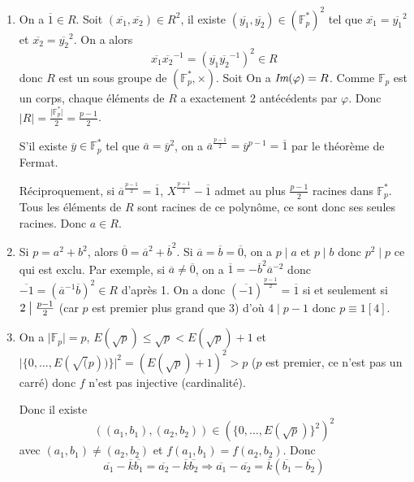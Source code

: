 \begin{solution}
	\phantom{}
	\begin{enumerate}
		\item On a $\overline{1}\in R$. Soit $(\overline{x_{1}},\overline{x_{2}})\in R^{2}$, il existe $(\overline{y_{1}},\overline{y_{2}})\in(\mathbb{F}_{p}^{*})^{2}$ tel que $\overline{x_{1}}=\overline{y_{1}}^{2}$ et $\overline{x_{2}}=\overline{y_{2}}^{2}$. On a  alors 
		$$\overline{x_{1}}\overline{x_{2}}^{-1}=(\overline{y_{1}}\overline{y_{2}}^{-1})^{2}\in R$$ donc $R$ est un sous groupe de $(\mathbb{F}_{p}^{*},\times)$. Soit 
		On a $\emph{Im}(\varphi)=R$. Comme $\mathbb{F}_{p}$ est un corps, chaque éléments de $R$ a exactement 2 antécédents par $\varphi$. Donc $\vert R\vert=\frac{\vert\mathbb{F}_{p}^{*}\vert}{2}=\frac{p-1}{2}$.

		S'il existe $\overline{y}\in\mathbb{F}_{p}^{*}$ tel que $\overline{a}=\overline{y}^{2}$, on a $\overline{a}^{\frac{p-1}{2}}=\overline{y}^{p-1}=\overline{1}$ par le théorème de Fermat.

		Réciproquement, si $\overline{a}^{\frac{p-1}{2}}=\overline{1}$, $X^{\frac{p-1}{2}}-\overline{1}$ admet au plus $\frac{p-1}{2}$ racines dans $\mathbb{F}_{p}^{*}$. Tous les éléments de $R$ sont racines de ce polynôme, ce sont donc ses seules racines. Donc $a\in R$.

		\item Si $p=a^{2}+b^{2}$, alors $\overline{0}=\overline{a}^{2}+\overline{b}^{2}$. Si $\overline{a}=\overline{b}=\overline{0}$, on a $p\mid a$ et $p\mid b$ donc $p^{2}\mid p$ ce qui est exclu. Par exemple, si $\overline{a}\neq\overline{0}$, on a $\overline{1}=-\overline{b}^{2}\overline{a}^{-2}$ donc $\overline{-1}=(\overline{a}^{-1}\overline{b})^{2}\in R$ d'après 1. On a donc $(\overline{-1})^{\frac{p-1}{2}}=\overline{1}$ si et seulement si $2\bigm|\frac{p-1}{2}$ (car $p$ est premier plus grand que 3) d'où $4\mid p-1$ donc $p\equiv 1[4]$.
		
		\item On a $\vert\mathbb{F}_{p}\vert=p$, $E(\sqrt{p})\leqslant\sqrt{p}<E(\sqrt{p})+1$ et $\vert\{0,\dots,E(\sqrt(p))\}\vert^{2}=(E(\sqrt{p})+1)^{2}>p$ ($p$ est premier, ce n'est pas un carré) donc $f$ n'est pas injective (cardinalité).
		
		Donc il existe 
		$$((a_{1},b_{1}),(a_{2},b_{2}))\in(\{0,\dots,E(\sqrt{p})\}^{2})^{2}$$ avec $(a_{1},b_{1})\neq (a_{2},b_{2})$ et $f(a_{1},b_{1})=f(a_{2},b_{2})$. Donc 
		$$\overline{a_{1}}-\overline{k}\overline{b_{1}}=\overline{a_{2}}-\overline{k}\overline{b_{2}}\Rightarrow \overline{a_{1}}-\overline{a_{2}}=\overline{k}(\overline{b_{1}}-\overline{b_{2}})$$
		

\end{enumerate}
\end{solution}
